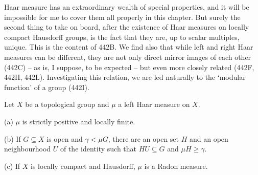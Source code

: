 
\def\chaptername{Topological groups}
\def\sectionname{Uniqueness of Haar measures}


Haar measure has an extraordinary wealth of special properties, and it
will be impossible for me to cover them all properly in this chapter.
But surely the second thing to take on board, after the existence of
Haar measures on locally compact Hausdorff groups, is
the fact that they are, up to scalar multiples, unique.   This is the
content of 442B.   We find also that while left and right Haar measures
can be different, they are not only direct mirror
images of each other (442C)
-- as is, I suppose, to be expected --  but even more closely related
(442F, 442H, 442L).   Investigating this relation, we are led naturally
to the `modular function' of a group (442I).

 Let $X$ be a topological group and $\mu$ a left
Haar measure on $X$.

(a) $\mu$ is strictly positive and locally finite.

(b) If $G\subseteq X$ is open and $\gamma<\mu G$, there are an open set
$H$ and an open neighbourhood $U$ of the identity such that
$HU\subseteq G$ and $\mu H\ge\gamma$.

(c) If $X$ is locally compact and Hausdorff, $\mu$ is a Radon measure.


